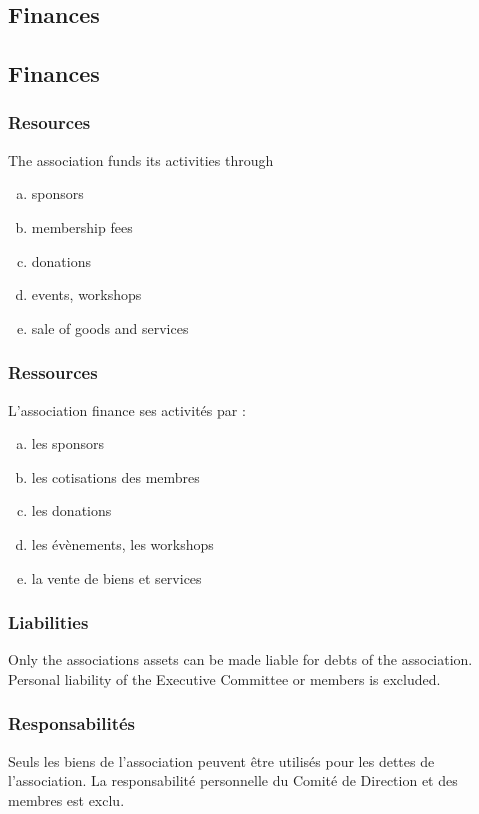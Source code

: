 \documentclass[12pt,a4paper,oneside]{article}
\newcounter{art}
\newcommand{\english}{    \switchcolumn[0]\noindent}
\newcommand{\french}{    \switchcolumn[1]\noindent}
\begin{document}
\begin{paracol}{2}


\english
	\subsection{Finances}

\french
	\subsection{Finances}

	\english
	\subsubsection{Resources}
	The association funds its activities through 

	\begin{enumerate}[(a)]
	\item sponsors
	\item membership fees
	\item donations
	\item events, workshops
	\item sale of goods and services
	\end{enumerate}

	\french
	\subsubsection{Ressources}
	L’association finance ses activités par :
	\begin{enumerate}[(a)]
	\item les sponsors
	\item les cotisations des membres
	\item les donations
	\item les évènements, les workshops
	\item la vente de biens et services
	\end{enumerate}



	\english
	\subsubsection{Liabilities}
	Only the associations assets can be made liable for debts of the association. Personal liability of the Executive Committee or members is excluded.


	\french
	\subsubsection{Responsabilités}
	Seuls les biens de l’association peuvent être utilisés pour les dettes de l’association. La responsabilité personnelle du Comité de Direction et des membres est exclu.



\end{paracol}
\end{document}
